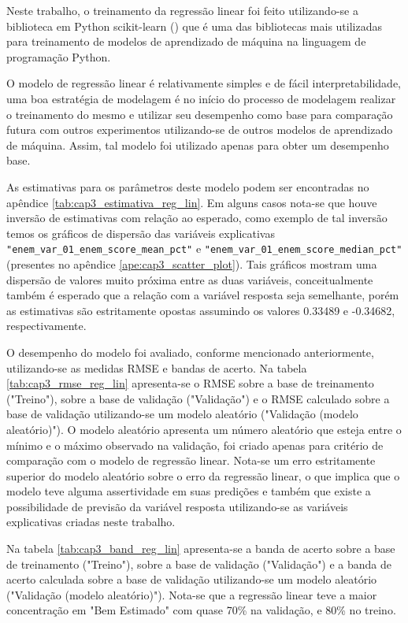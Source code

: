Neste trabalho, o treinamento da regressão linear foi feito utilizando-se a biblioteca em Python scikit-learn (\citet{Sklearn}) que é uma das bibliotecas mais utilizadas para treinamento de modelos de aprendizado de máquina na linguagem de programação Python.

O modelo de regressão linear é relativamente simples e de fácil interpretabilidade, uma boa estratégia de modelagem é no início do processo de modelagem realizar o treinamento do mesmo e utilizar seu desempenho como base para comparação futura com outros experimentos utilizando-se de outros modelos de aprendizado de máquina. Assim, tal modelo foi utilizado apenas para obter um desempenho base.

As estimativas para os parâmetros deste modelo podem ser encontradas no apêndice \ref{tab:cap3_estimativa_reg_lin}. Em alguns casos nota-se que houve inversão de estimativas com relação ao esperado, como exemplo de tal inversão temos os gráficos de dispersão das variáveis explicativas \verb|"enem_var_01_enem_score_mean_pct"| e \verb|"enem_var_01_enem_score_median_pct"| (presentes no apêndice \ref{ape:cap3_scatter_plot}). Tais gráficos mostram uma dispersão de valores muito próxima entre as duas variáveis, conceitualmente também é esperado que a relação com a variável resposta seja semelhante, porém as estimativas são estritamente opostas assumindo os valores 0.33489 e -0.34682, respectivamente.

O desempenho do modelo foi avaliado, conforme mencionado anteriormente, utilizando-se as medidas RMSE e bandas de acerto. Na tabela \ref{tab:cap3_rmse_reg_lin} apresenta-se o RMSE sobre a base de treinamento ("Treino"), sobre a base de validação ("Validação") e o RMSE calculado sobre a base de validação utilizando-se um modelo aleatório ("Validação (modelo aleatório)"). O modelo aleatório apresenta um número aleatório que esteja entre o mínimo e o máximo observado na validação, foi criado apenas para critério de comparação com o modelo de regressão linear. Nota-se um erro estritamente superior do modelo aleatório sobre o erro da regressão linear, o que implica que o modelo teve alguma assertividade em suas predições e também que existe a possibilidade de previsão da variável resposta utilizando-se as variáveis explicativas criadas neste trabalho.

Na tabela \ref{tab:cap3_band_reg_lin} apresenta-se a banda de acerto sobre a base de treinamento ("Treino"), sobre a base de validação ("Validação") e a banda de acerto calculada sobre a base de validação utilizando-se um modelo aleatório ("Validação (modelo aleatório)"). Nota-se que a regressão linear teve a maior concentração em "Bem Estimado" com quase 70\% na validação, e 80\% no treino.

